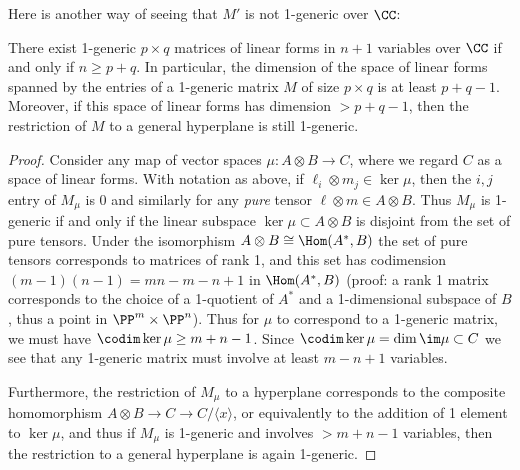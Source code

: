 Here is another way of seeing that $M'$ is not 1-generic over $\CC$:

\begin{lemma}\label{variables needed}
  \label{size of 1-generic} There exist 1-generic $p\times q$ matrices of linear forms in $n+1$ variables over $\CC$ if and only if $n\geq p+q$.
In particular, the dimension of the space of linear forms spanned by the entries of a  1-generic matrix $M$ of size $p\times q$ is at least $p+q-1$. Moreover, if this space of linear forms has dimension $>p+q-1$, then the restriction of $M$ to a general hyperplane is still 1-generic.
\end{lemma}
\begin{proof} Consider any map of vector spaces $\mu : A\otimes B \to C$, where we regard $C$ as a 
space of linear forms.
With notation as above, if $\ell_i\otimes m_j\in \ker \mu$, then the $i,j$ entry of $M_\mu$ is 0 and similarly for
any \emph{pure} tensor $\ell\otimes m\in A\otimes B$. Thus $M_\mu$ is 1-generic if and only if the linear subspace
$\ker \mu \subset  A\otimes B$
is disjoint from the set of pure tensors. Under the isomorphism $A\otimes B \cong \Hom (A^*, B)$
the set of pure tensors corresponds to matrices of rank 1, and this set has codimension $(m-1)(n-1) = mn-m-n+1$
in $\Hom(A^*, B)$ (proof: a rank 1 matrix corresponds to the choice of a 1-quotient of $A^*$ and a 1-dimensional subspace
of $B$, thus a point in $\PP^m \times \PP^n$).
Thus
for $\mu$ to correspond to a  1-generic matrix,  we must have $\codim \ker \mu \geq m+n-1$. Since $\codim \ker \mu = \dim \im \mu\subset C$ we see that any 1-generic matrix must involve at least $m-n+1$ variables. 

Furthermore, the restriction of $M_\mu$ to a hyperplane corresponds to the composite homomorphism
$A\otimes B \to C \to C/\langle x \rangle$, or equivalently to the addition of 1 element to $\ker \mu$, and thus
if $M_\mu$ is 1-generic and involves $>m+n-1$ variables, then the restriction to a general hyperplane
is again 1-generic.
\end{proof}

%

